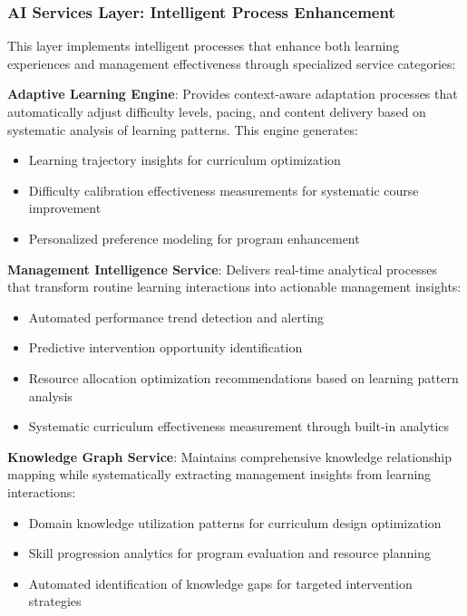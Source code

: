 \documentclass[conference]{IEEEtran}
\begin{document}
\subsubsection{AI Services Layer: Intelligent Process Enhancement}
This layer implements intelligent processes that enhance both learning experiences and management effectiveness through specialized service categories:

\textbf{Adaptive Learning Engine}: Provides context-aware adaptation processes that automatically adjust difficulty levels, pacing, and content delivery based on systematic analysis of learning patterns. This engine generates:
\begin{itemize}
    \item Learning trajectory insights for curriculum optimization
    \item Difficulty calibration effectiveness measurements for systematic course improvement
    \item Personalized preference modeling for program enhancement
\end{itemize}

\textbf{Management Intelligence Service}: Delivers real-time analytical processes that transform routine learning interactions into actionable management insights:
\begin{itemize}
    \item Automated performance trend detection and alerting
    \item Predictive intervention opportunity identification
    \item Resource allocation optimization recommendations based on learning pattern analysis
    \item Systematic curriculum effectiveness measurement through built-in analytics
\end{itemize}

\textbf{Knowledge Graph Service}: Maintains comprehensive knowledge relationship mapping while systematically extracting management insights from learning interactions:
\begin{itemize}
    \item Domain knowledge utilization patterns for curriculum design optimization
    \item Skill progression analytics for program evaluation and resource planning
    \item Automated identification of knowledge gaps for targeted intervention strategies
\end{itemize}
\end{document}
